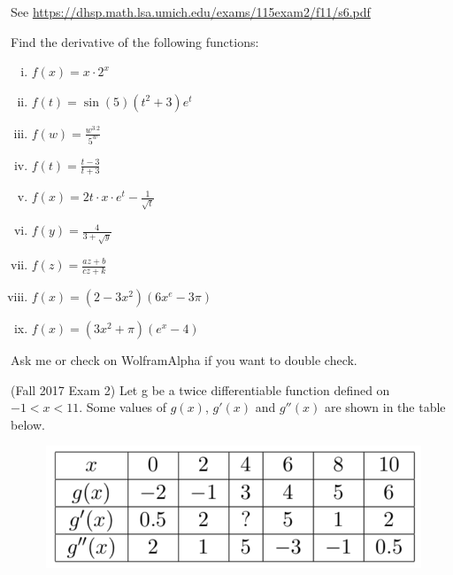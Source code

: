 \documentclass[11pt]{exam}
\begin{document}
\begin{questions}
    \begin{solution}
      See \href{https://dhsp.math.lsa.umich.edu/exams/115exam2/f11/s6.pdf}{https://dhsp.math.lsa.umich.edu/exams/115exam2/f11/s6.pdf}
    \end{solution}
  \question Find the derivative of the following functions:
\begin{multicols}{3}
    \begin{enumerate}[i.]
        \item $\displaystyle f(x) = x\cdot2^x$
        \item $\displaystyle f(t) = \sin(5)(t^2+3)e^t$
        \item $\displaystyle f(w) = \frac{w^{3.2}}{5^w}$
        \item $\displaystyle f(t) = \frac{t-3}{t+3}$
        \item $\displaystyle f(x) = 2t\cdot x \cdot e^t-\frac{1}{\sqrt{t}}$
        \item $\displaystyle f(y) = \frac{4}{3+\sqrt{y}}$
        \item $\displaystyle f(z) = \frac{az+b}{cz+k}$
        \item ${\displaystyle f(x) = (2-3x^2)(6x^e-3\pi)}$
        \item $\displaystyle f(x) = (3x^2+\pi)(e^x-4)$
    \end{enumerate}
\end{multicols}
\begin{solution}
  Ask me or check on WolframAlpha if you want to double check.
\end{solution}
\question (Fall 2017 Exam 2) %
  Let g be a twice differentiable function defined on $-1 < x < 11$. Some values of $g(x)$, $g'(x)$ and $g''(x)$ are shown in the table below.
	\begin{figure}[h]
	\centering
	\includegraphics[scale=0.5]{Figures/table1.png}	

\end{figure}
\end{questions}
\end{document}
